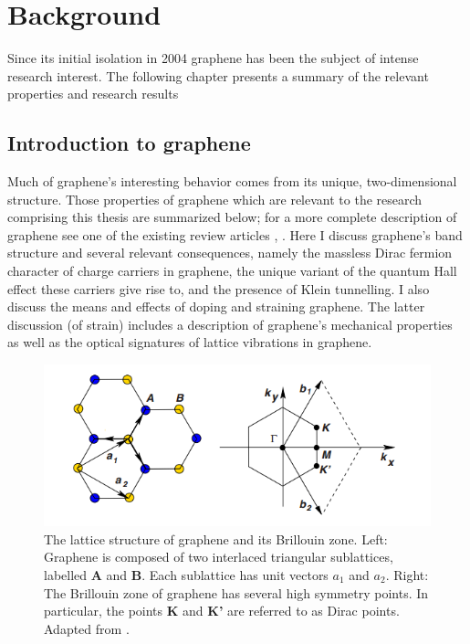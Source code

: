 \documentclass[edeposit,fullpage,draftthesis]{uiucthesis2009}
\begin{document}
\chapter{Background}
\label{sec:ch:bg}

    Since its initial isolation in 2004 graphene has been the subject of intense research interest. 
    The following chapter presents a summary of the relevant properties and research results 

    \section{Introduction to graphene}

    Much of graphene's interesting behavior comes from its unique, two-dimensional structure. 
    Those properties of graphene 
    which are relevant to the research comprising this thesis are summarized below; for a more complete description 
    of graphene see one of the existing review articles \cite{geim2007rise}, \cite{CastroNeto2009}. 
    Here I discuss graphene's band structure and several relevant consequences, namely 
    the massless Dirac fermion character of charge carriers in graphene, 
    the unique variant of the quantum Hall effect these carriers give rise to, 
    and the presence of Klein tunnelling.
    I also discuss the means and effects of doping and straining graphene. The latter discussion (of strain)
    includes a description of graphene's mechanical properties as well as the optical signatures of 
    lattice vibrations in graphene.
    
    \begin{figure}
    \centering
    \includegraphics{images/background/ElecPropertiesFig2.png}
    \caption[The lattice structure of graphene and its Brillouin zone]{The lattice structure of graphene and its Brillouin zone. Left: Graphene is composed of two interlaced triangular sublattices, labelled \textbf{A} and \textbf{B}. Each sublattice has unit vectors $a_1$ and $a_2$. Right: The Brillouin zone of graphene has several high symmetry points. In particular, the points \textbf{K} and \textbf{K'} are referred to as Dirac points. Adapted from \cite{CastroNeto2009}.}
    \label{fig:lattice}
    \end{figure}
		
\end{document}

